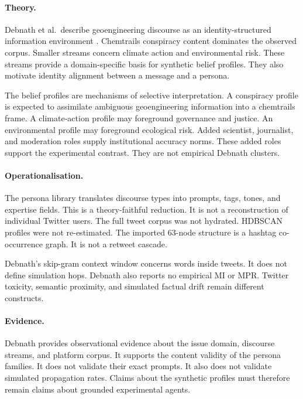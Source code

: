 \paragraph{Theory.}
Debnath et al.\ describe geoengineering discourse as an identity-structured information environment \parencite{debnath2023conspiracy}.
Chemtrails conspiracy content dominates the observed corpus.
Smaller streams concern climate action and environmental risk.
These streams provide a domain-specific basis for synthetic belief profiles.
They also motivate identity alignment between a message and a persona.

The belief profiles are mechanisms of selective interpretation.
A conspiracy profile is expected to assimilate ambiguous geoengineering information into a chemtrails frame.
A climate-action profile may foreground governance and justice.
An environmental profile may foreground ecological risk.
Added scientist, journalist, and moderation roles supply institutional accuracy norms.
These added roles support the experimental contrast.
They are not empirical Debnath clusters.

\paragraph{Operationalisation.}
The persona library translates discourse types into prompts, tags, tones, and expertise fields.
This is a theory-faithful reduction.
It is not a reconstruction of individual Twitter users.
The full tweet corpus was not hydrated.
HDBSCAN profiles were not re-estimated.
The imported 63-node structure is a hashtag co-occurrence graph.
It is not a retweet cascade.

Debnath's skip-gram context window concerns words inside tweets.
It does not define simulation hops.
Debnath also reports no empirical MI or MPR.
Twitter toxicity, semantic proximity, and simulated factual drift remain different constructs.

\paragraph{Evidence.}
Debnath provides observational evidence about the issue domain, discourse streams, and platform corpus.
It supports the content validity of the persona families.
It does not validate their exact prompts.
It also does not validate simulated propagation rates.
Claims about the synthetic profiles must therefore remain claims about grounded experimental agents.

